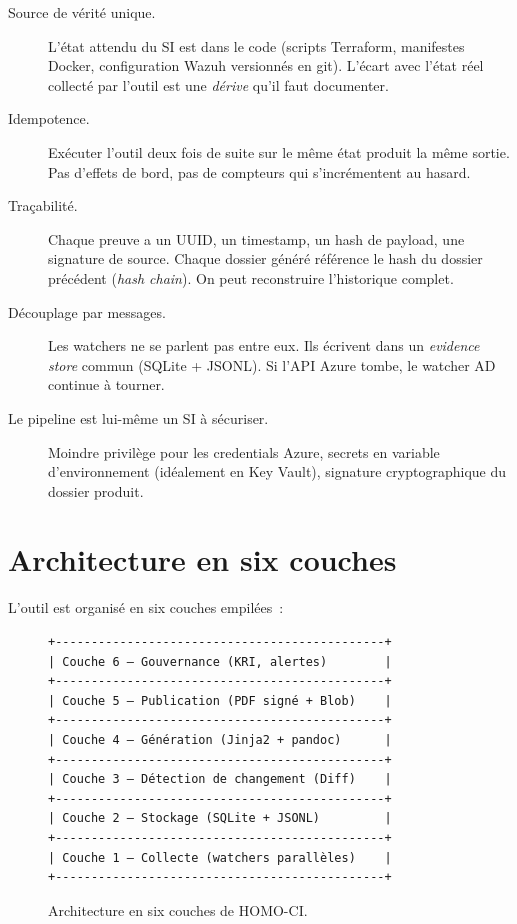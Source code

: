 \begin{description}
  \item[Source de vérité unique.] L'état attendu du SI est dans
    le code (scripts Terraform, manifestes Docker, configuration
    Wazuh versionnés en git). L'écart avec l'état réel collecté
    par l'outil est une \emph{dérive} qu'il faut documenter.
  \item[Idempotence.] Exécuter l'outil deux fois de suite sur le
    même état produit la même sortie. Pas d'effets de bord, pas
    de compteurs qui s'incrémentent au hasard.
  \item[Traçabilité.] Chaque preuve a un UUID, un timestamp, un
    hash de payload, une signature de source. Chaque dossier
    généré référence le hash du dossier précédent
    (\emph{hash chain}). On peut reconstruire l'historique
    complet.
  \item[Découplage par messages.] Les watchers ne se parlent
    pas entre eux. Ils écrivent dans un \emph{evidence store}
    commun (SQLite + JSONL). Si l'API Azure tombe, le watcher AD
    continue à tourner.
  \item[Le pipeline est lui-même un SI à sécuriser.] Moindre
    privilège pour les credentials Azure, secrets en variable
    d'environnement (idéalement en Key Vault), signature
    cryptographique du dossier produit.
\end{description}

\section{Architecture en six couches}

L'outil est organisé en six couches empilées~:

\begin{figure}[h]
\centering
\begin{small}
\begin{verbatim}
+----------------------------------------------+
| Couche 6 — Gouvernance (KRI, alertes)        |
+----------------------------------------------+
| Couche 5 — Publication (PDF signé + Blob)    |
+----------------------------------------------+
| Couche 4 — Génération (Jinja2 + pandoc)      |
+----------------------------------------------+
| Couche 3 — Détection de changement (Diff)    |
+----------------------------------------------+
| Couche 2 — Stockage (SQLite + JSONL)         |
+----------------------------------------------+
| Couche 1 — Collecte (watchers parallèles)    |
+----------------------------------------------+
\end{verbatim}
\end{small}
\caption{Architecture en six couches de HOMO-CI.}
\label{fig:archi-pipeline}
\end{figure}

